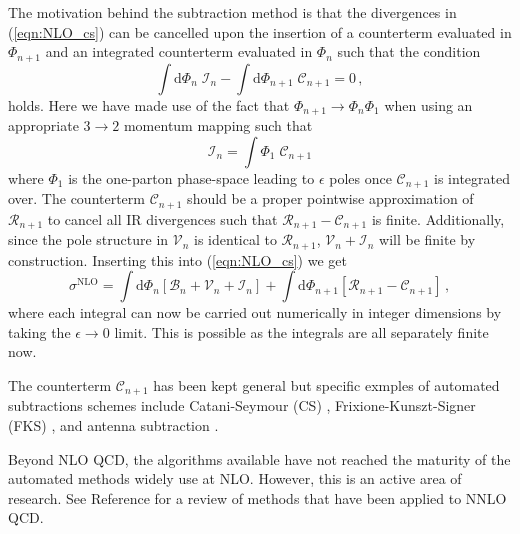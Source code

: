 \documentclass[main.tex]{subfiles}
\begin{document}
    The motivation behind the subtraction method is that the
    divergences in (\ref{eqn:NLO_cs}) can be cancelled upon the insertion
    of a counterterm evaluated in $\Phi_{n+1}$ and an integrated counterterm
    evaluated in $\Phi_{n}$ such that the condition
    \begin{equation}\label{eqn:subtraction_term_condition}
        \int \mathrm{d}\Phi_{n} \; \mathcal{I}_{n} - \int \mathrm{d}\Phi_{n+1} \; \mathcal{C}_{n+1} = 0 \, ,
    \end{equation}
    holds. Here we have made use of the fact that
    $\Phi_{n+1} \rightarrow \Phi_{n}\Phi_{1}$ when using
    an appropriate $3 \rightarrow 2$ momentum mapping such that
    \begin{equation}\label{eqn:integrated_counterterm}
        \mathcal{I}_{n} = \int \Phi_{1} \; \mathcal{C}_{n+1}
    \end{equation}
    where $\Phi_{1}$ is the one-parton phase-space leading
    to $\epsilon$ poles once $\mathcal{C}_{n+1}$ is integrated over.
    The counterterm $\mathcal{C}_{n+1}$ should be a proper
    pointwise approximation of $\mathcal{R}_{n+1}$ to cancel all IR
    divergences such that $\mathcal{R}_{n+1} - \mathcal{C}_{n+1}$ is finite.
    Additionally, since the pole structure in $\mathcal{V}_{n}$ is identical
    to $\mathcal{R}_{n+1}$, $\mathcal{V}_{n} + \mathcal{I}_{n}$ will be finite
    by construction.
    Inserting this into (\ref{eqn:NLO_cs}) we get
    \begin{equation}\label{eqn:NLO_subtraction}
        \sigma^{\mathrm{NLO}} = \int \mathrm{d}\Phi_{n} \left[\mathcal{B}_{n} + \mathcal{V}_{n} + \mathcal{I}_{n}\right] + \int \mathrm{d}\Phi_{n+1} \left[\mathcal{R}_{n+1} - \mathcal{C}_{n+1}\right] \, ,
    \end{equation}
    where each integral can now be carried out numerically
    in integer dimensions by taking the $\epsilon \rightarrow 0$
    limit. This is possible as the integrals are all separately
    finite now.

    The counterterm $\mathcal{C}_{n+1}$ has been kept general
    but specific exmples of automated subtractions schemes include
    Catani-Seymour (CS) \cite{Catani:1996vz,Catani:2002hc},
    Frixione-Kunszt-Signer (FKS) \cite{Frixione:1995ms,Frixione:1997np},
    and antenna subtraction \cite{Campbell:1998nn,Kosower:1997zr,Kosower:2003bh}.

    Beyond NLO QCD, the algorithms available have
    not reached the maturity of the automated methods widely use
    at NLO. However, this is an active area of
    research. See Reference \cite{TorresBobadilla:2020ekr} for a review of methods
    that have been applied to NNLO QCD.
\end{document}

